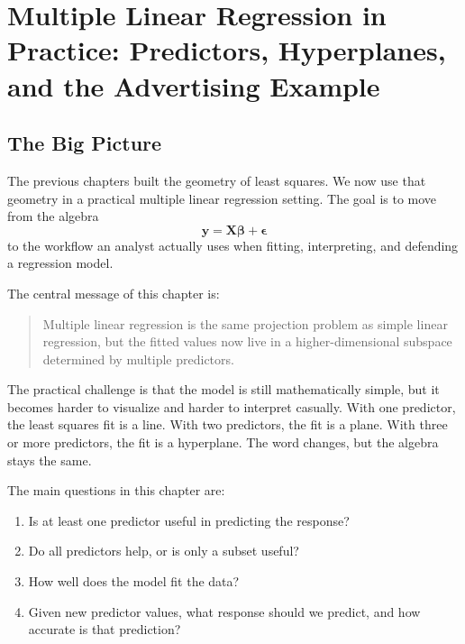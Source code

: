 \chapter{Multiple Linear Regression in Practice: Predictors, Hyperplanes, and the Advertising Example}
\label{chap:mlr-in-practice-predictors-hyperplanes-advertising}

\section{The Big Picture}

The previous chapters built the geometry of least squares.  We now use that geometry in a practical multiple linear regression setting.  The goal is to move from the algebra
\begin{equation}
  \mathbf{y}=\mathbf{X}\boldsymbol{\beta}+\boldsymbol{\epsilon}
\end{equation}
to the workflow an analyst actually uses when fitting, interpreting, and defending a regression model.

The central message of this chapter is:
\begin{quote}
  Multiple linear regression is the same projection problem as simple linear regression, but the fitted values now live in a higher-dimensional subspace determined by multiple predictors.
\end{quote}

The practical challenge is that the model is still mathematically simple, but it becomes harder to visualize and harder to interpret casually.  With one predictor, the least squares fit is a line.  With two predictors, the fit is a plane.  With three or more predictors, the fit is a hyperplane.  The word changes, but the algebra stays the same.

The main questions in this chapter are:
\begin{enumerate}
  \item Is at least one predictor useful in predicting the response?
  \item Do all predictors help, or is only a subset useful?
  \item How well does the model fit the data?
  \item Given new predictor values, what response should we predict, and how accurate is that prediction?
\end{enumerate}

